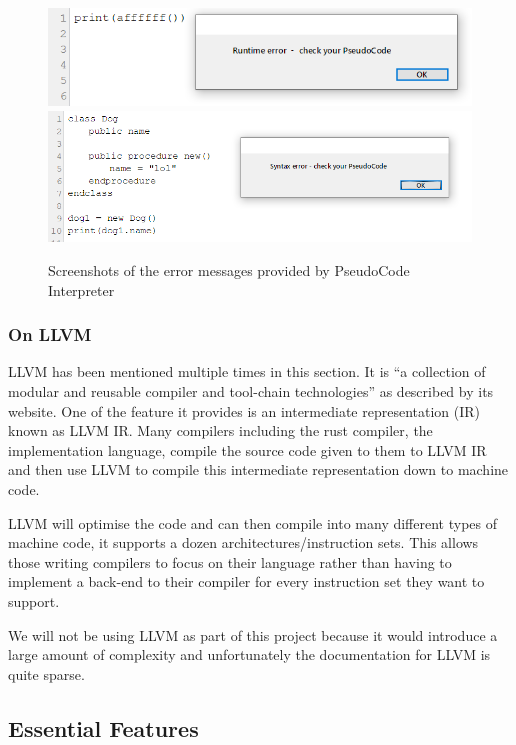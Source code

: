 \documentclass{article}
\begin{document}
\begin{figure}
	\includegraphics[width=\textwidth]{pseudocodeuk_runtime_err}
	\includegraphics[width=\textwidth]{pseudocodeuk_syntax_err}
	\caption{Screenshots of the error messages provided by PseudoCode
	Interpreter}
	\label{fig:pseudocodeuk_errors}
\end{figure}

\subsubsection{On LLVM}

LLVM has been mentioned multiple times in this section. It is ``a collection of
modular and reusable compiler and tool-chain technologies'' as described by its
website. One of the feature it provides is an intermediate representation (IR)
known as LLVM IR. Many compilers including the rust compiler, the
implementation language, compile the source code given to them to LLVM IR and
then use LLVM to compile this intermediate representation down to machine code.

LLVM will optimise the code and can then compile into many different types of
machine code, it supports a dozen architectures/instruction sets. This allows
those writing compilers to focus on their language rather than having to
implement a back-end to their compiler for every instruction set they want to
support.

We will not be using LLVM as part of this project because it would introduce a
large amount of complexity and unfortunately the documentation for LLVM is
quite sparse.

\subsection{Essential Features}
\end{document}
